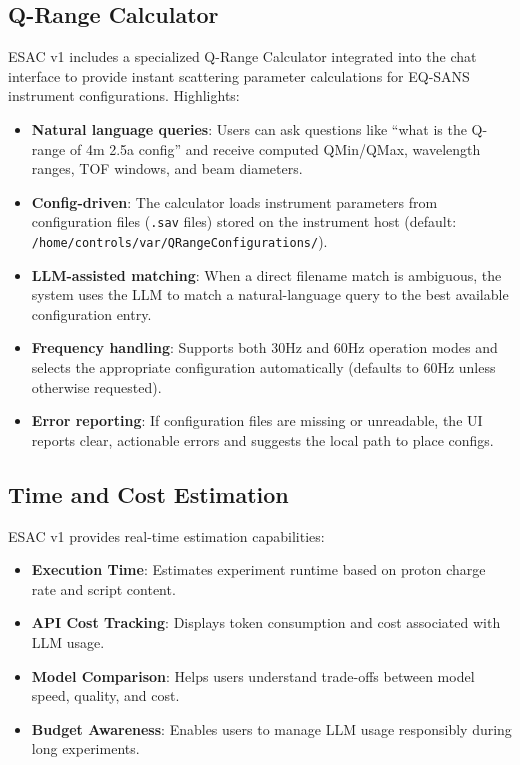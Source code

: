 \documentclass[tm]{ornltm} %
\begin{document}
\subsection{Q-Range Calculator}
\label{subsec:qrange}

ESAC v1 includes a specialized Q-Range Calculator integrated into the chat interface to provide instant scattering parameter calculations for EQ-SANS instrument configurations. Highlights:

\begin{itemize}
  \item \textbf{Natural language queries}: Users can ask questions like ``what is the Q-range of 4m 2.5a config'' and receive computed QMin/QMax, wavelength ranges, TOF windows, and beam diameters.
  \item \textbf{Config-driven}: The calculator loads instrument parameters from configuration files (\texttt{.sav} files) stored on the instrument host (default: \texttt{/home/controls/var/QRangeConfigurations/}).
  \item \textbf{LLM-assisted matching}: When a direct filename match is ambiguous, the system uses the LLM to match a natural-language query to the best available configuration entry.
  \item \textbf{Frequency handling}: Supports both 30Hz and 60Hz operation modes and selects the appropriate configuration automatically (defaults to 60Hz unless otherwise requested).
  \item \textbf{Error reporting}: If configuration files are missing or unreadable, the UI reports clear, actionable errors and suggests the local path to place configs.
\end{itemize}

\subsection{Time and Cost Estimation}
\label{subsec:estimation}

ESAC v1 provides real-time estimation capabilities:

\begin{itemize}
  \item \textbf{Execution Time}: Estimates experiment runtime based on proton charge rate and script content.
  \item \textbf{API Cost Tracking}: Displays token consumption and cost associated with LLM usage.
  \item \textbf{Model Comparison}: Helps users understand trade-offs between model speed, quality, and cost.
  \item \textbf{Budget Awareness}: Enables users to manage LLM usage responsibly during long experiments.
\end{itemize}
\end{document}
